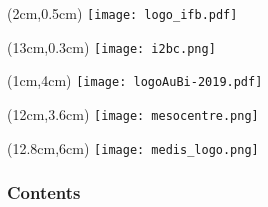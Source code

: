 \begin{frame}
  \titlepage
  \begin{textblock*}{5cm}(2cm,0.5cm) %
  \texttt{[image: logo\_ifb.pdf]}
  \end{textblock*}
  \begin{textblock*}{5cm}(13cm,0.3cm) %
  \texttt{[image: i2bc.png]}
  \end{textblock*}
  \begin{textblock*}{5cm}(1cm,4cm) %
  \texttt{[image: logoAuBi-2019.pdf]}
  \end{textblock*}
  \begin{textblock*}{5cm}(12cm,3.6cm) %
  \texttt{[image: mesocentre.png]}
  \end{textblock*}
   \begin{textblock*}{5cm}(12.8cm,6cm) %
  \texttt{[image: medis\_logo.png]}
  \end{textblock*}
\end{frame}

\begin{frame}
  \frametitle{Contents}
  \begin{multicols*}{2}
  \tableofcontents
  \end{multicols*}
\end{frame}
